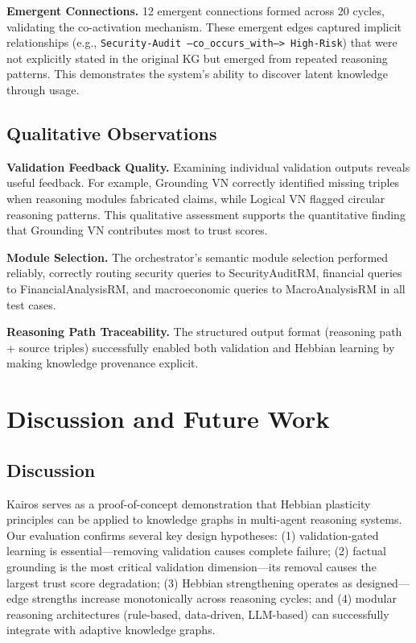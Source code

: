 \documentclass{article}
\begin{document}
\textbf{Emergent Connections.} 12 emergent connections formed across 20 cycles, validating the co-activation mechanism. These emergent edges captured implicit relationships (e.g., \texttt{Security-Audit --co\_occurs\_with--> High-Risk}) that were not explicitly stated in the original KG but emerged from repeated reasoning patterns. This demonstrates the system's ability to discover latent knowledge through usage.

\subsection{Qualitative Observations}

\textbf{Validation Feedback Quality.} Examining individual validation outputs reveals useful feedback. For example, Grounding VN correctly identified missing triples when reasoning modules fabricated claims, while Logical VN flagged circular reasoning patterns. This qualitative assessment supports the quantitative finding that Grounding VN contributes most to trust scores.

\textbf{Module Selection.} The orchestrator's semantic module selection performed reliably, correctly routing security queries to SecurityAuditRM, financial queries to FinancialAnalysisRM, and macroeconomic queries to MacroAnalysisRM in all test cases.

\textbf{Reasoning Path Traceability.} The structured output format (reasoning path + source triples) successfully enabled both validation and Hebbian learning by making knowledge provenance explicit.

\section{Discussion and Future Work}
\label{sec:discussion}

\subsection{Discussion}

Kairos serves as a proof-of-concept demonstration that Hebbian plasticity principles can be applied to knowledge graphs in multi-agent reasoning systems. Our evaluation confirms several key design hypotheses: (1) validation-gated learning is essential—removing validation causes complete failure; (2) factual grounding is the most critical validation dimension—its removal causes the largest trust score degradation; (3) Hebbian strengthening operates as designed—edge strengths increase monotonically across reasoning cycles; and (4) modular reasoning architectures (rule-based, data-driven, LLM-based) can successfully integrate with adaptive knowledge graphs.
\end{document}
